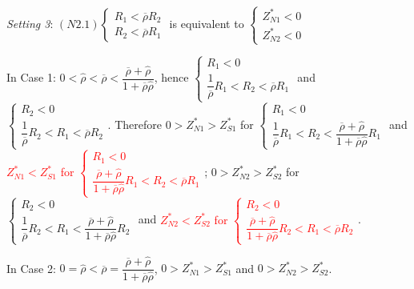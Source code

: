 \documentclass[10pt]{article}
\newcommand{\hhred}{\textcolor{red}}
\begin{document}
{\it Setting 3}: $ (N2.1) \left\{ \begin{matrix} R_1 < \overline{\rho} R_2 \\ R_2 < \overline{\rho} R_1 \end{matrix} \right. $ is equivalent to $ \left\{ \begin{matrix} Z_{N 1}^* < 0 \\ Z_{N 2}^* < 0 \end{matrix} \right. $

In Case 1: $ 0 < {\hat \rho} < \overline{\rho} < \dfrac{\overline{\rho} + {\hat \rho}}{1 + \overline{\rho} {\hat \rho}} $, 
hence $ \left\{ \begin{matrix} R_1 < 0 \\ \dfrac{1}{\overline{\rho}} R_1 < R_2 < \overline{\rho} R_1 \end{matrix} \right. $ and $ \left\{ \begin{matrix} R_2 < 0 \\ \dfrac{1}{\overline{\rho}} R_2 < R_1 < \overline{\rho} R_2 \end{matrix} \right. $.
Therefore $ 0 > Z_{N 1}^* > Z_{S 1}^* $ for $ \left\{ \begin{matrix} R_1 < 0 \\ \dfrac{1}{\overline{\rho}} R_1 < R_2 < \dfrac{\overline{\rho} + {\hat \rho}}{1 + \overline{\rho} {\hat \rho}} R_1 \end{matrix} \right. $ and \hhred{$ Z_{N 1}^* < Z_{S 1}^* $ for $ \left\{ \begin{matrix} R_1 < 0 \\ \dfrac{\overline{\rho} + {\hat \rho}}{1 + \overline{\rho} {\hat \rho}} R_1 < R_2 < \overline{\rho} R_1 \end{matrix} \right. $}; 
$ 0 > Z_{N 2}^* > Z_{S 2}^* $ for $ \left\{ \begin{matrix} R_2 < 0 \\ \dfrac{1}{\overline{\rho}} R_2 < R_1 < \dfrac{\overline{\rho} + {\hat \rho}}{1 + \overline{\rho} {\hat \rho}} R_2 \end{matrix} \right. $ and \hhred{$ Z_{N 2}^* < Z_{S 2}^* $ for $ \left\{ \begin{matrix} R_2 < 0 \\ \dfrac{\overline{\rho} + {\hat \rho}}{1 + \overline{\rho} {\hat \rho}} R_2 < R_1 < \overline{\rho} R_2 \end{matrix} \right. $}.

In Case 2: $ 0 = {\hat \rho} < \overline{\rho} = \dfrac{\overline{\rho} + {\hat \rho}}{1 + \overline{\rho} {\hat \rho}} $, $ 0 > Z_{N 1}^* > Z_{S 1}^* $ and $ 0 > Z_{N 2}^* > Z_{S 2}^* $.
\end{document}
